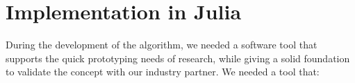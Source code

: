 \documentclass{juliacon}
\begin{document}





\section{Implementation in Julia}
\label{sec:approach}

During the development of the algorithm, we needed a software tool that supports the quick prototyping needs of research, while giving a solid foundation to validate the concept with our industry partner.
We needed a tool that:
\end{document}
